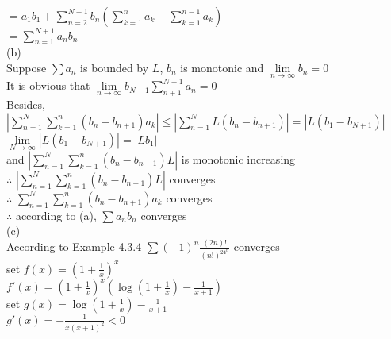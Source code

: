 \documentclass{article}
\begin{document}
\hskip 5.6cm $\displaystyle = a_1b_1 + \sum \limits_{n=2}^{N+1} b_n(\sum \limits_{k=1}^n a_k - \sum \limits_{k=1}^{n-1} a_k)$\\

\hskip 5.6cm $\displaystyle = \sum \limits_{n=1}^{N+1} a_nb_n$\\

(b)\\

Suppose $\sum a_n$ is bounded by $L$, $b_n$ is monotonic and $\lim \limits_{n \to \infty}b_n = 0$\\

It is obvious that $\lim \limits_{n \to \infty}b_{N+1} \sum \limits_{n+1}^{N+1}a_n = 0$\\

Besides, $|\sum \limits_{n=1}^N \sum \limits_{k=1}^n (b_n-b_{n+1})a_k| \leq |\sum \limits_{n=1}^N L (b_n-b_{n+1})| = |L(b_1-b_{N+1})|$ \qquad $\lim \limits_{N \to \infty} |L(b_1 - b_{N+1})| = |Lb_1|$\\

and $|\sum \limits_{n=1}^N \sum \limits_{k=1}^n (b_n-b_{n+1})L|$ is monotonic increasing\\

$\therefore$ \qquad $\displaystyle |\sum \limits_{n=1}^N \sum \limits_{k=1}^n (b_n-b_{n+1})L|$ converges\\

$\therefore$ \qquad $\displaystyle \sum \limits_{n=1}^N \sum \limits_{k=1}^n (b_n-b_{n+1})a_k$ converges\\

$\therefore$ \qquad according to (a), $\sum a_nb_n$ converges\\

(c)\\

According to Example 4.3.4 $\sum (-1)^n\frac{(2n)!}{(n!)^24^n}$ converges\\

set $f(x) = \left(1+\frac{1}{x}\right)^x$\\

$\displaystyle f'(x) = \left(1+\frac{1}{x}\right)^x\left(\log\left({1+\frac{1}{x}}\right) - \frac{1}{x+1}\right)$\\

set $g(x) = \log\left({1+\frac{1}{x}}\right) - \frac{1}{x+1}$\\

$\displaystyle g'(x) = - \frac{1}{x(x+1)^2} < 0$\\
\end{document}
